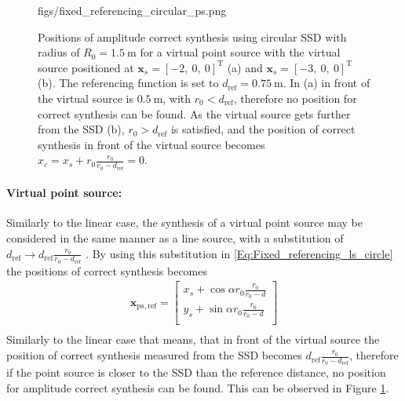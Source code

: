 \documentclass[12pt,a4paper]{article}
\newcommand{\dref}{d_{\mathrm{ref}}}
\begin{document}
\begin{figure}
	\centering
	\begin{overpic}[width = 1\columnwidth]{figs/fixed_referencing_circular_ps.png}
	\end{overpic}
\caption{ Positions of amplitude correct synthesis using circular SSD with radius of $R_0 = 1.5~\mathrm{m}$ for a virtual point source with the virtual source positioned at $\mathbf{x}_s = [-2,\ 0,\ 0]^{\mathrm{T}}$ (a) and $\mathbf{x}_s = [-3,\ 0,\ 0]^{\mathrm{T}}$ (b). The referencing function is set to $\dref = 0.75~\mathrm{m}$. In (a) in front of the virtual source is $0.5~\mathrm{m}$, with $r_0< \dref$, therefore no position for correct synthesis can be found. As the virtual source gets further from the SSD (b), $r_0> \dref$ is satisfied, and the position of correct synthesis in front of the virtual source becomes $x_c = x_s + r_0\frac{r_0}{r_0-\dref} = 0$. }
	\label{Fig:Theory:fixed_referencing_circular_ps}
\end{figure}
\paragraph{Virtual point source:\\}
Similarly to the linear case, the synthesis of a virtual point source may be considered in the same manner as a line source, with a substitution of $\dref \rightarrow \dref \frac{r_0}{r_0 - \dref}$ . By using this substitution in \eqref{Eq:Fixed_referencing_ls_circle} the positions of correct synthesis becomes
\begin{eqnarray}
\mathbf{x}_{\mathrm{ps, ref}} =  \begin{bmatrix} x_s + \cos\alpha r_0 \frac{r_0}{r_0 - d}  \\[0.3em] y_s + \sin\alpha r_0 \frac{r_0}{r_0 - d} \\[0.3em]    \end{bmatrix} \\
\label{Eq:Fixed_referencing_ps_circle}
\end{eqnarray}
Similarly to the linear case that means, that in front of the virtual source the position of correct synthesis measured from the SSD becomes $\dref \frac{r_0}{r_0- \dref}$, therefore if the point source is closer to the SSD than the reference distance, no position for amplitude correct synthesis can be found. This can be observed in Figure \ref{Fig:Theory:fixed_referencing_circular_ps}.
\end{document}
